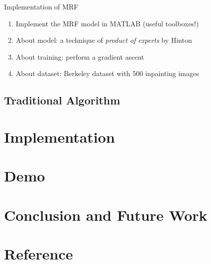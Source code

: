 \documentclass{beamer}
\begin{document}
\begin{frame}{Implementation of MRF}
\begin{enumerate}
\item Implement the MRF model in MATLAB (useful toolboxes!)
\item About model: a technique of \emph{product of experts} by Hinton
\item About training: perform a gradient ascent
\item About dataset: Berkeley dataset with 500 inpainting images
\end{enumerate}
\end{frame}

\subsection{Traditional Algorithm}


\section{Implementation}

\section{Demo}

\section{Conclusion and Future Work}

\section*{Reference}


\end{document}
